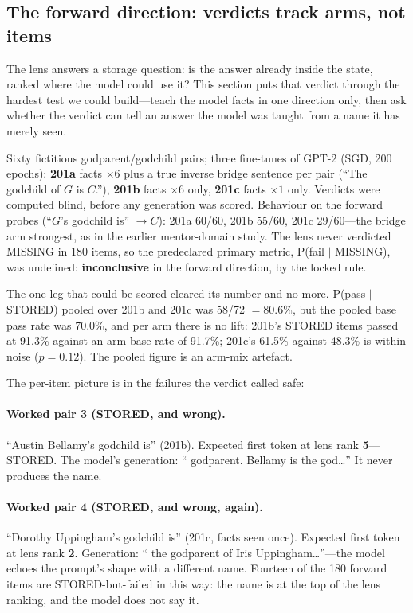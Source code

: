 \documentclass[11pt]{article}
\begin{document}
\subsection{The forward direction: verdicts track arms, not items}

The lens answers a storage question: is the answer already inside
the state, ranked where the model could use it? This section puts
that verdict through the hardest test we could build---teach the
model facts in one direction only, then ask whether the verdict can
tell an answer the model was taught from a name it has merely seen.

Sixty fictitious godparent/godchild pairs; three fine-tunes of GPT-2
(SGD, 200 epochs): \textbf{201a} facts $\times 6$ plus a true inverse
bridge sentence per pair (``The godchild of $G$ is $C$.''), \textbf{201b}
facts $\times 6$ only, \textbf{201c} facts $\times 1$ only. Verdicts
were computed blind, before any generation was scored. Behaviour on the
forward probes (``$G$'s godchild is'' $\to C$): 201a 60/60, 201b
55/60, 201c 29/60---the bridge arm strongest, as in the earlier
mentor-domain study. The lens never verdicted MISSING in 180 items, so
the predeclared primary metric, P(fail $\mid$ MISSING), was undefined:
\textbf{inconclusive} in the forward direction, by the locked rule.

The one leg that could be scored cleared its number and no more.
P(pass $\mid$ STORED) pooled over 201b and 201c was 58/72 $= 80.6\%$,
but the pooled base pass rate was 70.0\%, and per arm there is no lift:
201b's STORED items passed at 91.3\% against an arm base rate of
91.7\%; 201c's 61.5\% against 48.3\% is within noise ($p = 0.12$). The
pooled figure is an arm-mix artefact.

The per-item picture is in the failures the verdict called safe:

\paragraph{Worked pair 3 (STORED, and wrong).}
``Austin Bellamy's godchild is'' (201b). Expected first token at lens
rank \textbf{5}---STORED. The model's generation: `` godparent.
Bellamy is the god\ldots'' It never produces the name.

\paragraph{Worked pair 4 (STORED, and wrong, again).}
``Dorothy Uppingham's godchild is'' (201c, facts seen once). Expected
first token at lens rank \textbf{2}. Generation: `` the godparent of
Iris Uppingham\ldots''---the model echoes the prompt's shape with a
different name. Fourteen of the 180 forward items are STORED-but-failed
in this way: the name is at the top of the lens ranking, and the model
does not say it.
\end{document}
